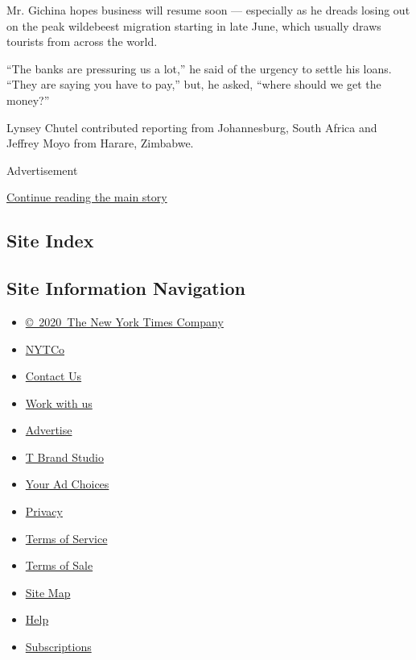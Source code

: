 Mr. Gichina hopes business will resume soon --- especially as he dreads
losing out on the peak wildebeest migration starting in late June, which
usually draws tourists from across the world.

``The banks are pressuring us a lot,'' he said of the urgency to settle
his loans. ``They are saying you have to pay,'' but, he asked, ``where
should we get the money?''

Lynsey Chutel contributed reporting from Johannesburg, South Africa and
Jeffrey Moyo from Harare, Zimbabwe.

Advertisement

\protect\hyperlink{after-bottom}{Continue reading the main story}

\hypertarget{site-index}{%
\subsection{Site Index}\label{site-index}}

\hypertarget{site-information-navigation}{%
\subsection{Site Information
Navigation}\label{site-information-navigation}}

\begin{itemize}
\tightlist
\item
  \href{https://help.nytimes.com/hc/en-us/articles/115014792127-Copyright-notice}{©~2020~The
  New York Times Company}
\end{itemize}

\begin{itemize}
\tightlist
\item
  \href{https://www.nytco.com/}{NYTCo}
\item
  \href{https://help.nytimes.com/hc/en-us/articles/115015385887-Contact-Us}{Contact
  Us}
\item
  \href{https://www.nytco.com/careers/}{Work with us}
\item
  \href{https://nytmediakit.com/}{Advertise}
\item
  \href{http://www.tbrandstudio.com/}{T Brand Studio}
\item
  \href{https://www.nytimes.com/privacy/cookie-policy\#how-do-i-manage-trackers}{Your
  Ad Choices}
\item
  \href{https://www.nytimes.com/privacy}{Privacy}
\item
  \href{https://help.nytimes.com/hc/en-us/articles/115014893428-Terms-of-service}{Terms
  of Service}
\item
  \href{https://help.nytimes.com/hc/en-us/articles/115014893968-Terms-of-sale}{Terms
  of Sale}
\item
  \href{https://spiderbites.nytimes.com}{Site Map}
\item
  \href{https://help.nytimes.com/hc/en-us}{Help}
\item
  \href{https://www.nytimes.com/subscription?campaignId=37WXW}{Subscriptions}
\end{itemize}
